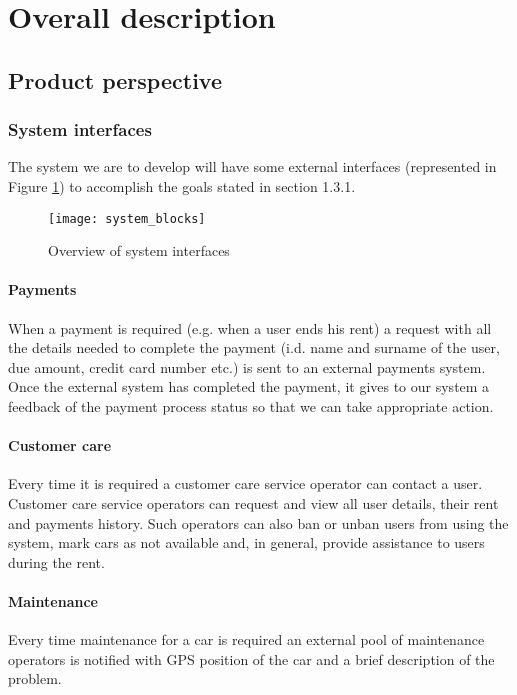 \section{Overall description}
\subsection{Product perspective}
	\subsubsection{System interfaces}
	\label{sec:systemInterfaces}
		The system we are to develop will have some external interfaces (represented in Figure \ref{fig:systemInterfaces}) to accomplish the goals stated in section 1.3.1.
		\begin{figure}[h]
			\centering
			\texttt{[image: system\_blocks]}
			\caption{
				\label{fig:systemInterfaces} 
				Overview of system interfaces
			}
		\end{figure}
	\paragraph{Payments}
	When a payment is required (e.g. when a user ends his rent) a request with all the details needed to complete the payment (i.d. name and surname of the user, due amount, credit card number etc.) is sent to an external payments system. Once the external system has completed the payment, it gives to our system a feedback of the payment process status so that we can take appropriate action.
	
	\paragraph{Customer care} Every time it is required a customer care service operator can contact a user. Customer care service operators can request and view all user details, their rent and payments history. Such operators can also ban or unban users from using the system, mark cars as not available and, in general, provide assistance to users during the rent.

	\paragraph{Maintenance} Every time maintenance for a car is required an external pool of maintenance operators is notified with GPS position of the car and a brief description of the problem.

